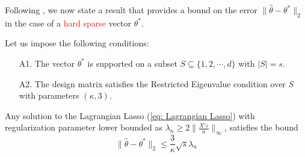 \documentclass[10pt,handout,english]{beamer}
\begin{document}
\begin{frame}[allowframebreaks]
Following \citet{wainwright2019high}, we now state a result that provides a bound on the error $\lVert \hat{\theta}-\theta^*\rVert_2$ in the case of a \textcolor{red}{hard sparse} vector $\theta^*$. \justifying

Let us impose the following conditions:
\begin{itemize}
\setlength\itemsep{0.5em}
\item[A1.] The vector $\theta^*$ is supported on a subset $S\subseteq \{1,2,\cdots,d\}$ with $\lvert S\rvert=s$. 
\item[A2.] The design matrix satisfies the Restricted Eigenvalue condition over $S$ with parameters $(\kappa,3)$.
\end{itemize}
\begin{theorem}
Any solution to the Lagrangian Lasso (\ref{eq: Lagrangian Lasso}) with regularization parameter lower bounded as $\lambda_n\geq2\lVert\frac{X'\varepsilon}{n}\rVert_{\infty}$, satisfies the bound
\[
\lVert \hat{\theta}-\theta^*\rVert_2\leq\frac{3}{\kappa}\sqrt{s}\lambda_n
\]
\end{theorem}
\end{frame}
\end{document}
